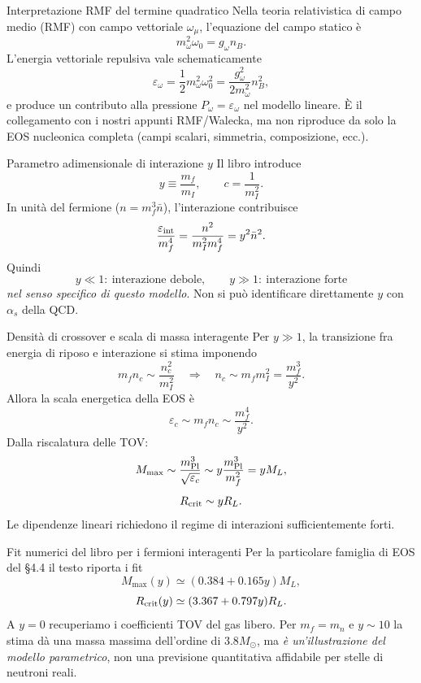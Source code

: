 \begin{frame}[t]{Interpretazione RMF del termine quadratico}
\small
Nella teoria relativistica di campo medio (RMF) con campo vettoriale $\omega_\mu$, l'equazione del campo statico è
\[
m_\omega^2\omega_0=g_\omega n_B.
\]
L'energia vettoriale repulsiva vale schematicamente
\[
\varepsilon_\omega=\frac12m_\omega^2\omega_0^2
=\frac{g_\omega^2}{2m_\omega^2}n_B^2,
\]
e produce un contributo alla pressione $P_\omega=\varepsilon_\omega$ nel modello lineare.
\medskip
È il collegamento con i nostri appunti RMF/Walecka, ma non riproduce da solo la EOS nucleonica completa (campi scalari, simmetria, composizione, ecc.).
\end{frame}

\begin{frame}[t]{Parametro adimensionale di interazione $y$}
\small
Il libro introduce
\[
y\equiv\frac{m_f}{m_I},\qquad c=\frac1{m_I^2}.
\]
In unità del fermione ($n=m_f^3\bar n$), l'interazione contribuisce
\[
\frac{\varepsilon_{\rm int}}{m_f^4}=
\frac{n^2}{m_I^2m_f^4}=y^2\bar n^2.
\]
Quindi
\[
y\ll1:\ \text{interazione debole},\qquad
y\gg1:\ \text{interazione forte}
\]
\emph{nel senso specifico di questo modello}. Non si può identificare direttamente $y$ con $\alpha_s$ della QCD.
\end{frame}

\begin{frame}[t]{Densità di crossover e scala di massa interagente}
\small
Per $y\gg1$, la transizione fra energia di riposo e interazione si stima imponendo
\[
m_fn_c\sim\frac{n_c^2}{m_I^2}
\quad\Longrightarrow\quad n_c\sim m_fm_I^2
=\frac{m_f^3}{y^2}.
\]
Allora la scala energetica della EOS è
\[
\varepsilon_c\sim m_fn_c\sim\frac{m_f^4}{y^2}.
\]
Dalla riscalatura delle TOV:
\[
M_{\max}\sim\frac{m_{\rm Pl}^3}{\sqrt{\varepsilon_c}}
\sim y\frac{m_{\rm Pl}^3}{m_f^2}=yM_L,
\]
\[
R_{\rm crit}\sim yR_L.
\]
Le dipendenze lineari richiedono il regime di interazioni sufficientemente forti.
\end{frame}

\begin{frame}[t]{Fit numerici del libro per i fermioni interagenti}
\small
Per la particolare famiglia di EOS del §4.4 il testo riporta i fit
\[
M_{\max}(y)\simeq(0.384+0.165y)M_L,
\]
\[
R_{\rm crit}(y)\simeq(3.367+0.797y)R_L.
\]
A $y=0$ recuperiamo i coefficienti TOV del gas libero.
\medskip
Per $m_f=m_n$ e $y\sim10$ la stima dà una massa massima dell'ordine di $3.8M_\odot$, ma \emph{è un'illustrazione del modello parametrico}, non una previsione quantitativa affidabile per stelle di neutroni reali.
\end{frame}

